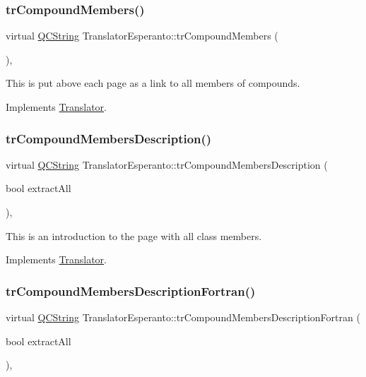 \subsubsection{\texorpdfstring{trCompoundMembers()}{trCompoundMembers()}}
{\footnotesize\ttfamily virtual \mbox{\hyperlink{class_q_c_string}{Q\+C\+String}} Translator\+Esperanto\+::tr\+Compound\+Members (\begin{DoxyParamCaption}{ }\end{DoxyParamCaption})\hspace{0.3cm}{\ttfamily [inline]}, {\ttfamily [virtual]}}

This is put above each page as a link to all members of compounds. 

Implements \mbox{\hyperlink{class_translator}{Translator}}.

\mbox{\label{class_translator_esperanto_a6e758456aa5b51f99d19b015ef44fddc}} 
\subsubsection{\texorpdfstring{trCompoundMembersDescription()}{trCompoundMembersDescription()}}
{\footnotesize\ttfamily virtual \mbox{\hyperlink{class_q_c_string}{Q\+C\+String}} Translator\+Esperanto\+::tr\+Compound\+Members\+Description (\begin{DoxyParamCaption}\item[{bool}]{extract\+All }\end{DoxyParamCaption})\hspace{0.3cm}{\ttfamily [inline]}, {\ttfamily [virtual]}}

This is an introduction to the page with all class members. 

Implements \mbox{\hyperlink{class_translator}{Translator}}.

\mbox{\label{class_translator_esperanto_a426cd70cbaa9b17f50e54e55a3fc56da}} 
\subsubsection{\texorpdfstring{trCompoundMembersDescriptionFortran()}{trCompoundMembersDescriptionFortran()}}
{\footnotesize\ttfamily virtual \mbox{\hyperlink{class_q_c_string}{Q\+C\+String}} Translator\+Esperanto\+::tr\+Compound\+Members\+Description\+Fortran (\begin{DoxyParamCaption}\item[{bool}]{extract\+All }\end{DoxyParamCaption})\hspace{0.3cm}{\ttfamily [inline]}, {\ttfamily [virtual]}}

